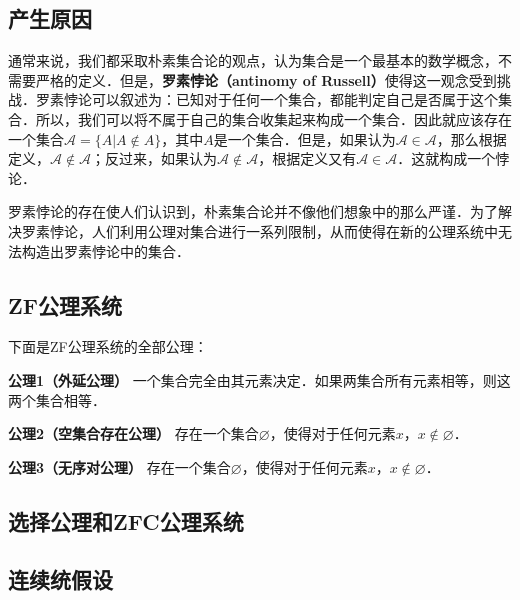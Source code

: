 \begin{issues}
\issueTODO
\end{issues}

\subsection{产生原因}
通常来说，我们都采取朴素集合论的观点，认为集合是一个最基本的数学概念，不需要严格的定义．但是，\textbf{罗素悖论（antinomy of Russell）}使得这一观念受到挑战．罗素悖论可以叙述为：已知对于任何一个集合，都能判定自己是否属于这个集合．所以，我们可以将不属于自己的集合收集起来构成一个集合．因此就应该存在一个集合$\mathcal{A}=\{A|A\notin A\}$，其中$A$是一个集合．但是，如果认为$\mathcal{A}\in\mathcal{A}$，那么根据定义，$\mathcal{A}\notin\mathcal{A}$；反过来，如果认为$\mathcal{A}\notin\mathcal{A}$，根据定义又有$\mathcal{A}\in\mathcal{A}$．这就构成一个悖论．

罗素悖论的存在使人们认识到，朴素集合论并不像他们想象中的那么严谨．为了解决罗素悖论，人们利用公理对集合进行一系列限制，从而使得在新的公理系统中无法构造出罗素悖论中的集合．

\subsection{ZF公理系统}
下面是ZF公理系统的全部公理：

\textbf{公理1（外延公理）} 一个集合完全由其元素决定．如果两集合所有元素相等，则这两个集合相等．

\textbf{公理2（空集合存在公理）} 存在一个集合$\varnothing$，使得对于任何元素$x$，$x\notin\varnothing$．

\textbf{公理3（无序对公理）} 存在一个集合$\varnothing$，使得对于任何元素$x$，$x\notin\varnothing$．

\subsection{选择公理和ZFC公理系统}

\subsection{连续统假设}



